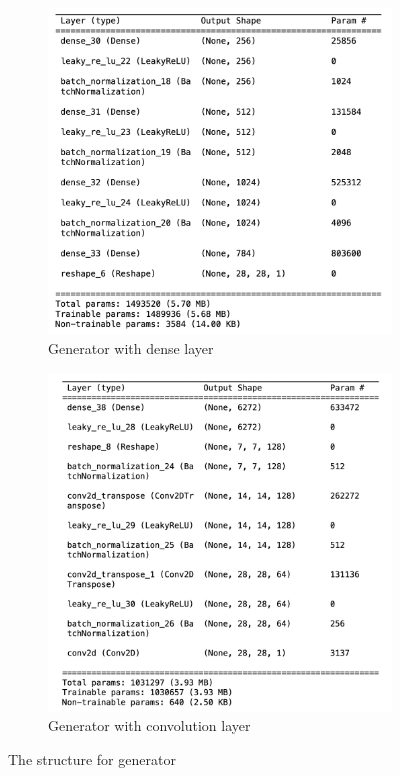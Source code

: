 \begin{figure}[H]
    \centering
    \begin{subfigure}[b]{0.45\linewidth}
        \centering
        \includegraphics[width=\linewidth]{./Images/generator_dense.jpg}
        \caption{Generator with dense layer}
        \label{fig:Dense}
    \end{subfigure}
    \hspace{0.05\linewidth}
    \begin{subfigure}[b]{0.45\linewidth}
        \centering
        \includegraphics[width=\linewidth]{./Images/generator_cnn.jpg}
        \caption{Generator with convolution layer}
        \label{fig:Conv2D Transpose}
    \end{subfigure}
    \caption{The structure for generator}
    \label{fig:combined}
\end{figure}



